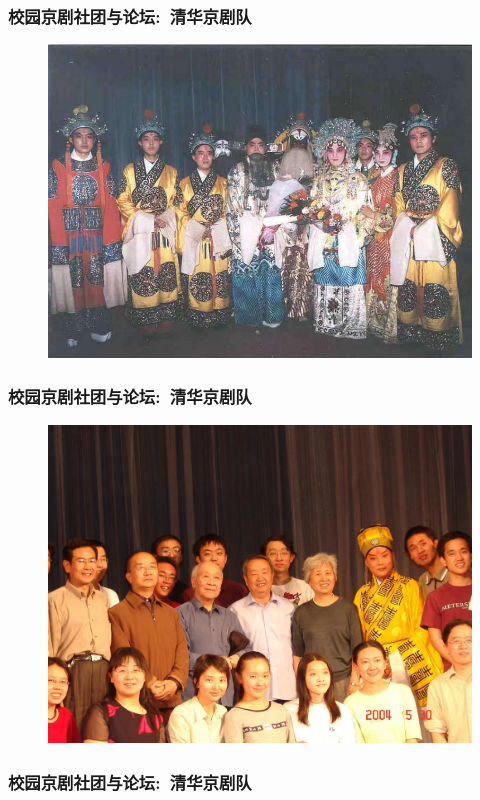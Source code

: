 \documentclass[cjk,slidestop,compress,mathserif,blue]{beamer}
\begin{document}
\frame
{
	\frametitle{校园京剧社团与论坛:~清华京剧队}
\begin{figure}[h!]
\centering
\vspace{-0.3in}
\includegraphics[height=0.70\textwidth,width=1.00\textwidth,clip]{Figures_Peking-Opera/PekOpe_THU-2.jpg}
\label{THU-2}
\end{figure}
}

\frame
{
	\frametitle{校园京剧社团与论坛:~清华京剧队}
\begin{figure}[h!]
\centering
\vspace{-0.2in}
\includegraphics[height=0.70\textwidth,width=1.00\textwidth,clip]{Figures_Peking-Opera/PekOpe_THU-3.jpg}
\label{THU-3}
\end{figure}
}

\frame
{
	\frametitle{校园京剧社团与论坛:~清华京剧队}
\centering
\vspace{-0.15in}
\fontsize{4.2pt}{3.2pt}\selectfont{
}
}
\end{document}
